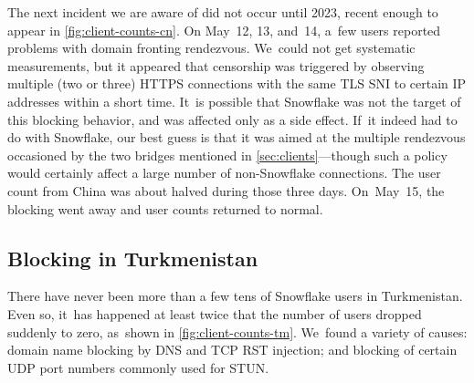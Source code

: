 \documentclass[letterpaper,twocolumn]{article}
\begin{document}
The next incident we are aware of did not occur until 2023,
recent enough to appear in \autoref{fig:client-counts-cn}.
On May~12, 13, and~14, a~few users reported problems
with domain fronting rendezvous.
We~could not get systematic measurements,
but it appeared that censorship was triggered
by observing multiple (two or three) HTTPS connections
with the same TLS SNI to certain IP addresses within a short time.
It~is possible that Snowflake was not the target of this
blocking behavior, and was affected only as a side effect.
If~it indeed had to do with Snowflake,
our best guess is that it was aimed at the multiple rendezvous
occasioned by the two bridges mentioned in \autoref{sec:clients}---though such a
policy would certainly affect a large number of non-Snowflake connections.
The user count from China was about halved during those three days.
On~May~15, the blocking went away and user counts returned to normal.


\subsection{Blocking in Turkmenistan}
\label{sec:block-tm}


There have never been more than a few tens of Snowflake users in Turkmenistan.
Even so, it~has happened at least twice
that the number of users dropped suddenly to zero,
as~shown in \autoref{fig:client-counts-tm}.
We~found a variety of causes:
domain name blocking
by DNS and TCP RST injection;
and blocking of certain UDP port numbers
commonly used for STUN.
\end{document}
